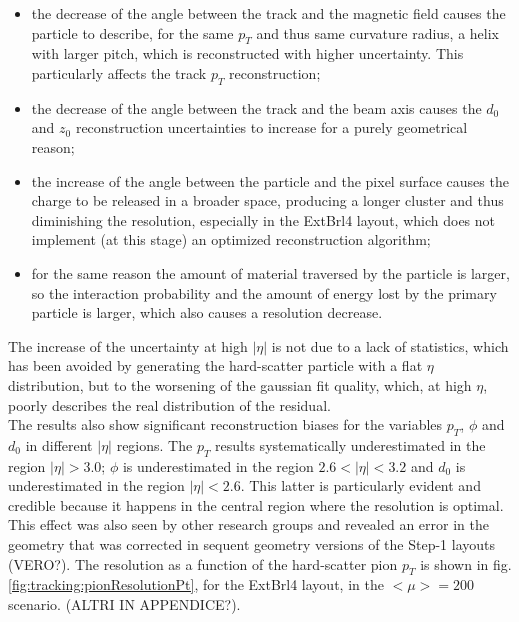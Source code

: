 \documentclass[a4paper,twoside,12pt]{article}
\begin{document}
\begin{itemize}
\item the decrease of the angle between  the track and the magnetic field causes the particle to describe, for the same $p_{T}$ and thus same curvature radius, a helix with larger pitch,
	which is reconstructed with higher uncertainty. This particularly affects the track $p_{T}$ reconstruction;
\item the decrease of the angle between the track and the beam axis causes the $d_{0}$ and $z_{0}$ reconstruction uncertainties to increase for a purely geometrical reason;
\item the increase of the angle between the particle and the pixel surface causes the charge to be released in a broader space, producing a longer cluster and thus diminishing the resolution, 
	especially in the ExtBrl4 layout, which does not implement (at this stage) an optimized reconstruction algorithm;
\item for the same reason the amount of material traversed by the particle is larger, so the interaction probability and the amount of energy lost by the primary particle is larger, which also causes a resolution decrease.
\end{itemize}

The increase of the uncertainty at high $|\eta|$ is not due to a lack of statistics, which has been avoided by generating the hard-scatter particle with a flat $\eta$ distribution, but to the
worsening of the gaussian fit quality, which, at high $\eta$, poorly describes the real distribution of the residual.\\

The results also show significant reconstruction biases for the variables $p_{T}$, $\phi$ and $d_{0}$ in different $|\eta|$ regions. The $p_{T}$ results systematically underestimated in the region
$|\eta| > 3.0$; 	$\phi$ is underestimated in the region $2.6 < |\eta| < 3.2$ and $d_{0}$  is underestimated in the region $|\eta| < 2.6$. This latter is particularly evident and credible because
it happens in the central region where the resolution is optimal. This effect was also seen by other research groups and revealed an error in the geometry that was corrected in sequent geometry versions of the Step-1 layouts (VERO?). 
The resolution as a function of the hard-scatter pion $p_{T}$ is shown in fig.\ref{fig:tracking:pionResolutionPt}, for the ExtBrl4 layout, in the $<\mu> = 200$ scenario. (ALTRI IN APPENDICE?).\\ 
\end{document}

